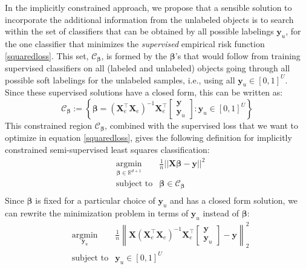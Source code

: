 \documentclass{llncs}
\newcommand{\featdim}{d}
\newcommand{\Nunl}{U}
\newcommand{\X}{\mathbf{X}  }
\newcommand{\Xe}{\mathbf{X}_e  }
\newcommand{\XeT}{\mathbf{X}_e^{\top}}
\newcommand{\ye}{\begin{bmatrix} \mathbf{y}  \\ \mathbf{y}_u \end{bmatrix}}
\begin{document}
In the implicitly constrained approach, we propose that a sensible solution to incorporate the additional information from the unlabeled objects is to search within the set of classifiers that can be obtained by all possible labelings $\textbf{y}_u$, for the one classifier that minimizes the \emph{supervised} empirical risk function \eqref{squaredloss}. This set, $\mathcal{C}_{\boldsymbol{\beta}}$, is formed by the $\boldsymbol{\beta}$'s that would follow from training supervised classifiers on all (labeled and unlabeled) objects going through all possible soft labelings for the unlabeled samples, i.e., using all $\textbf{y}_u \in [0,1]^{\Nunl}$. Since these supervised solutions have a closed form, this can be written as:
\begin{equation} \label{constrainedregion}
\mathcal{C}_{\boldsymbol{\beta}} := \left\{   \boldsymbol{\beta} = \left( {\XeT} {\Xe} \right)^{-1} {\XeT} \ye: \mathbf{y}_u \in [0,1]^{\Nunl} \right\}
\end{equation}
This constrained region $\mathcal{C}_{\boldsymbol{\beta}}$, combined with the supervised loss that we want to optimize in equation \eqref{squaredloss}, gives the following definition for implicitly constrained semi-supervised least squares classification:
\begin{equation}
\begin{aligned}
&\operatorname*{argmin}_{\boldsymbol{\beta} \in \mathbb{R}^{\featdim+1}} & \frac{1}{n}  ||\mathbf{X} \boldsymbol{\beta}-\mathbf{y}||^2  \\
& \text{subject to} & \boldsymbol{\beta} \in \mathcal{C}_{\boldsymbol{\beta}}  \\
\end{aligned}
\end{equation}
Since $\boldsymbol{\beta}$ is fixed for a particular choice of $\textbf{y}_u$ and has a closed form solution, we can rewrite the minimization problem in terms of $\textbf{y}_u$ instead of $\boldsymbol{\beta}$:
\begin{equation} \label{icls}
\begin{aligned}
& \operatorname*{argmin}_{\mathbf{y}_u} & \frac{1}{n}  \left\|  \X \left(\XeT \Xe \right)^{-1} \XeT \ye - \mathbf{y} \right\|_2^2 \\ 
& \text{subject to} & \mathbf{y}_u \in [0,1]^{\Nunl} \\
\end{aligned}
\end{equation}
\end{document}
